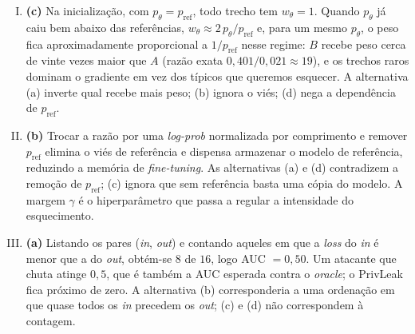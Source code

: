 \documentclass{dlproblemset}
\begin{document}
\begin{enumerate}[I)]
    \item \textbf{(c)} Na inicialização, com $p_\theta = p_{\text{ref}}$, todo trecho tem $w_\theta = 1$. Quando $p_\theta$ já caiu bem abaixo das referências, $w_\theta \approx 2\,p_\theta/p_{\text{ref}}$ e, para um mesmo $p_\theta$, o peso fica aproximadamente proporcional a $1/p_{\text{ref}}$ nesse regime: $B$ recebe peso cerca de vinte vezes maior que $A$ (razão exata $0{,}401/0{,}021 \approx 19$), e os trechos raros dominam o gradiente em vez dos típicos que queremos esquecer. A alternativa (a) inverte qual recebe mais peso; (b) ignora o viés; (d) nega a dependência de $p_{\text{ref}}$.

    \item \textbf{(b)} Trocar a razão por uma \textit{log-prob} normalizada por comprimento e remover $p_{\text{ref}}$ elimina o viés de referência e dispensa armazenar o modelo de referência, reduzindo a memória de \textit{fine-tuning}. As alternativas (a) e (d) contradizem a remoção de $p_{\text{ref}}$; (c) ignora que sem referência basta uma cópia do modelo. A margem $\gamma$ é o hiperparâmetro que passa a regular a intensidade do esquecimento.

    \item \textbf{(a)} Listando os pares (\textit{in}, \textit{out}) e contando aqueles em que a \textit{loss} do \textit{in} é menor que a do \textit{out}, obtém-se $8$ de $16$, logo AUC $= 0{,}50$. Um atacante que chuta atinge $0{,}5$, que é também a AUC esperada contra o \textit{oracle}; o PrivLeak fica próximo de zero. A alternativa (b) corresponderia a uma ordenação em que quase todos os \textit{in} precedem os \textit{out}; (c) e (d) não correspondem à contagem.
\end{enumerate}
\end{document}
